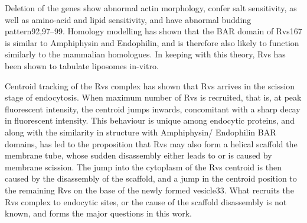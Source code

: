 		\vspace{5mm}
		Deletion of the genes show abnormal actin morphology, confer salt sensitivity, as well as amino-acid and lipid sensitivity, and have abnormal budding pattern92,97–99. Homology modelling has shown that the BAR domain of Rvs167 is similar to Amphiphysin and Endophilin, and is therefore also likely to function similarly to the mammalian homologues. In keeping with this theory, Rvs has been shown to tabulate liposomes in-vitro. 
		
		\vspace{5mm}
		Centroid tracking of the Rvs complex has shown that Rvs arrives in the scission stage of endocytosis. When maximum number of Rvs is recruited, that is, at peak fluorescent intensity, the centroid jumps inwards, concomitant with a sharp decay in fluorescent intensity. This behaviour is unique among endocytic proteins, and along with the similarity in structure with Amphiphysin/ Endophilin BAR domains, has led to the proposition that Rvs may also form a helical scaffold the membrane tube, whose sudden disassembly either leads to or is caused by membrane scission. The jump into the cytoplasm of the Rvs centroid is then caused by the disassembly of the scaffold, and a jump in the centroid position to the remaining Rvs on the base of the newly formed vesicle33. What recruits the Rvs complex to endocytic sites, or the cause of the scaffold disassembly is not known, and forms the major questions in this work.

		

